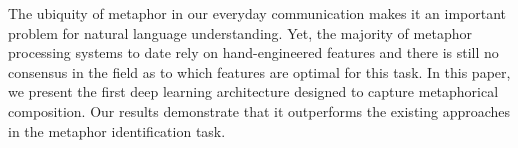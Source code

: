 The ubiquity of metaphor in our everyday communication makes it an important problem for natural language understanding. Yet, the majority of metaphor processing systems to date rely on hand-engineered features and there is still no consensus in the field as to which features are optimal for this task. In this paper, we present the first deep learning architecture designed to capture metaphorical composition. Our results demonstrate that it outperforms the existing approaches in the metaphor identification task.

